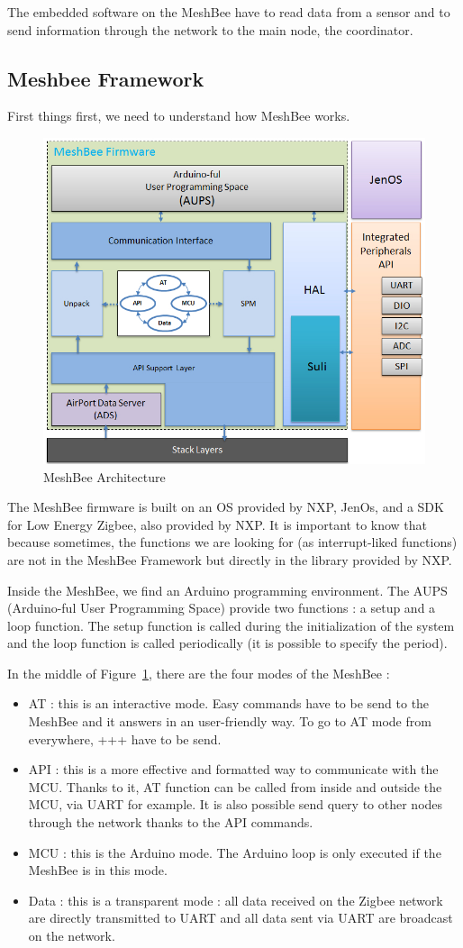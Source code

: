 The embedded software on the MeshBee have to read data from a sensor and to send information through the network to the main node, the coordinator.

\subsection{Meshbee Framework}

First things first, we need to understand how MeshBee works.

\begin{figure}[ht]
\centering
\includegraphics[width=.6\linewidth]{MeshBeeArchitecture}
\caption[MeshBee Architecture]{\label{f:MeshBeeArchitecture}MeshBee Architecture}
\end{figure}

The MeshBee firmware is built on an OS provided by NXP, JenOs, and a SDK for Low Energy Zigbee, also provided by NXP. It is important to know that because sometimes, the functions we are looking for (as interrupt-liked functions) are not in the MeshBee Framework but directly in the library provided by NXP.

Inside the MeshBee, we find an Arduino programming environment. The AUPS (Arduino-ful User Programming Space) provide two functions : a setup and a loop function. The setup function is called during the initialization of the system and the loop function is called periodically (it is possible to specify the period).

In the middle of Figure~\ref{f:MeshBeeArchitecture}, there are the four modes of the MeshBee :

\begin{itemize}
\item AT : this is an interactive mode. Easy commands have to be send to the MeshBee and it answers in an user-friendly way. To go to AT mode from everywhere, +++ have to be send.
\item API : this is a more effective and formatted way to communicate with the MCU. Thanks to it, AT function can be called from inside and outside the MCU, via UART for example. It is also possible send query to other nodes through the network thanks to the API commands.
\item MCU : this is the Arduino mode. The Arduino loop is only executed if the MeshBee is in this mode.
\item Data : this is a transparent mode : all data received on the Zigbee network are directly transmitted to UART and all data sent via UART are broadcast on the network.
\end{itemize}

